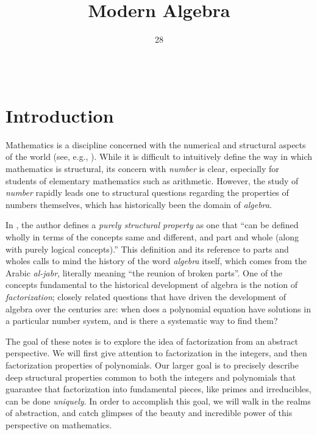 \documentclass[english,course]{lecture}
\title{Modern Algebra}
\date{28}{08}{2018}
\theoremstyle{plain}
\begin{document}
\newpage 

$\,$

\newpage



\section*{Introduction}\label{Sec-Introduction}


Mathematics is a discipline concerned with the numerical and structural aspects of the world (see, e.g., \cite{franklin2014aristotelian}).
While it is difficult to intuitively define the way in which mathematics is structural, its concern with \emph{number} is clear, especially for students of elementary mathematics such as arithmetic.
However, the study of \emph{number} rapidly leads one to structural questions regarding the properties of numbers themselves, which has historically been the domain of \emph{algebra}.

In \cite{franklin2014aristotelian}, the author defines a \emph{purely structural property} as one that ``can be defined wholly in terms of the concepts same and different, and part and whole (along with purely logical concepts).''  
This definition and its reference to parts and wholes calls to mind the history of the word \emph{algebra} itself, which comes from the Arabic \emph{al-jabr}, literally meaning ``the reunion of broken parts''.
One of the concepts fundamental to the historical development of algebra is the notion of \emph{factorization}; closely related questions that have driven the development of algebra over the centuries are: when does a polynomial equation have solutions in a particular number system, and is there a systematic way to find them?

The goal of these notes is to explore the idea of factorization from an abstract perspective.
We will first give attention to factorization in the integers, and then factorization properties of polynomials.
Our larger goal is to precisely describe deep structural properties common to both the integers and polynomials that guarantee that factorization into fundamental pieces, like primes and irreducibles, can be done \emph{uniquely}. 
In order to accomplish this goal, we will walk in the realms of abstraction, and catch glimpses of the beauty and incredible power of this perspective on mathematics.
\end{document}
